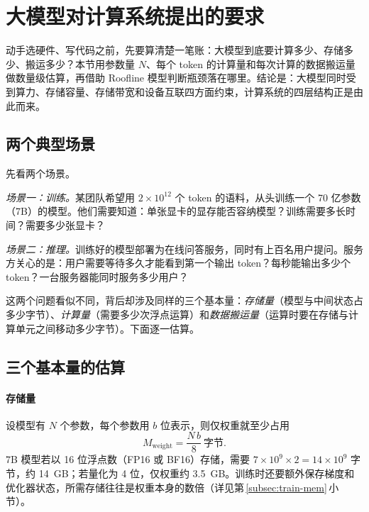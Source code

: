 \section{大模型对计算系统提出的要求}
\label{sec:req}

\begin{guide}
\noindent 动手选硬件、写代码之前，先要算清楚一笔账：大模型到底要计算多少、存储多少、搬运多少？本节用参数量 $N$、每个 token 的计算量和每次计算的数据搬运量做数量级估算，再借助 Roofline 模型判断瓶颈落在哪里。结论是：大模型同时受到算力、存储容量、存储带宽和设备互联四方面约束，计算系统的四层结构正是由此而来。
\end{guide}

\subsection{两个典型场景}

先看两个场景。

\emph{场景一：训练。}某团队希望用 $2\times10^{12}$ 个 token 的语料，从头训练一个 70 亿参数（7B）的模型。他们需要知道：单张显卡的显存能否容纳模型？训练需要多长时间？需要多少张显卡？

\emph{场景二：推理。}训练好的模型部署为在线问答服务，同时有上百名用户提问。服务方关心的是：用户需要等待多久才能看到第一个输出 token？每秒能输出多少个 token？一台服务器能同时服务多少用户？

这两个问题看似不同，背后却涉及同样的三个基本量：\emph{存储量}（模型与中间状态占多少字节）、\emph{计算量}（需要多少次浮点运算）和\emph{数据搬运量}（运算时要在存储与计算单元之间移动多少字节）。下面逐一估算。

\subsection{三个基本量的估算}
\label{subsec:three-quantities}

\paragraph{存储量} 设模型有 $N$ 个参数，每个参数用 $b$ 位表示，则仅权重就至少占用
\begin{equation}
  M_{\mathrm{weight}} = \frac{N\,b}{8}\ \text{字节}.
  \label{eq:weight-mem}
\end{equation}
7B 模型若以 16 位浮点数（FP16 或 BF16）存储，需要 $7\times10^{9}\times 2 = 14\times10^{9}$ 字节，约 \SI{14}{GB}；若量化为 4 位，仅权重约 \SI{3.5}{GB}。训练时还要额外保存梯度和优化器状态，所需存储往往是权重本身的数倍（详见第\,\ref{subsec:train-mem}\,小节）。

